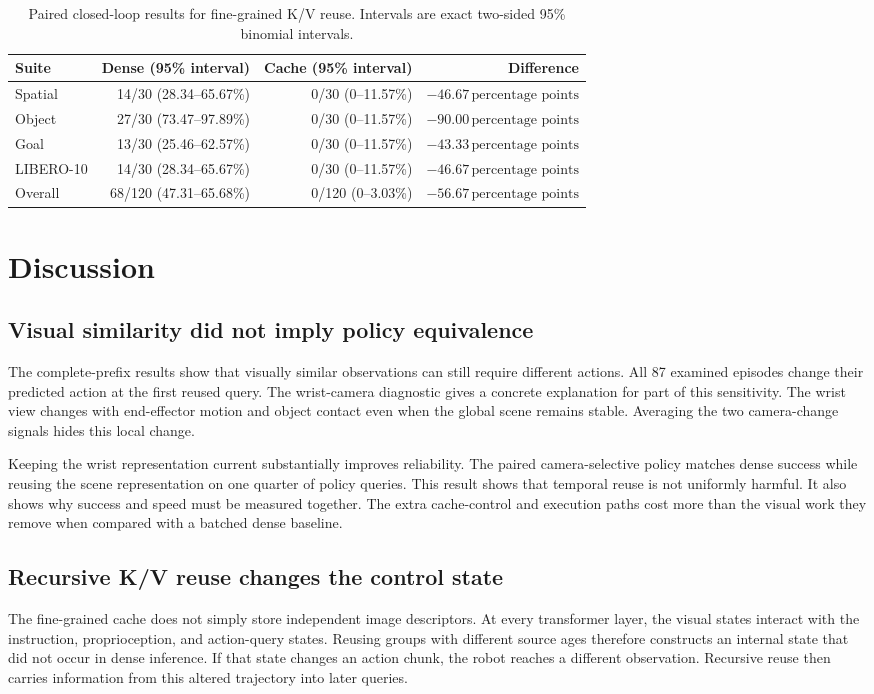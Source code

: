 \documentclass[journal]{IEEEtran}
\newcommand{\pp}{\,\text{percentage points}}
\begin{document}
\begin{table}[t]
\caption{Paired closed-loop results for fine-grained K/V reuse. Intervals are exact two-sided 95\% binomial intervals.}
\label{tab:kv}
\centering
\scriptsize
\begin{tabular}{@{}lrrr@{}}
\toprule
Suite & Dense (95\% interval) & Cache (95\% interval) & Difference \\
\midrule
Spatial & 14/30 (28.34--65.67\%) & 0/30 (0--11.57\%) & $-46.67\pp$ \\
Object & 27/30 (73.47--97.89\%) & 0/30 (0--11.57\%) & $-90.00\pp$ \\
Goal & 13/30 (25.46--62.57\%) & 0/30 (0--11.57\%) & $-43.33\pp$ \\
LIBERO-10 & 14/30 (28.34--65.67\%) & 0/30 (0--11.57\%) & $-46.67\pp$ \\
Overall & 68/120 (47.31--65.68\%) & 0/120 (0--3.03\%) & $-56.67\pp$ \\
\bottomrule
\end{tabular}
\end{table}

\section{Discussion}
\subsection{Visual similarity did not imply policy equivalence}
The complete-prefix results show that visually similar observations can still require different actions. All 87 examined episodes change their predicted action at the first reused query. The wrist-camera diagnostic gives a concrete explanation for part of this sensitivity. The wrist view changes with end-effector motion and object contact even when the global scene remains stable. Averaging the two camera-change signals hides this local change.

Keeping the wrist representation current substantially improves reliability. The paired camera-selective policy matches dense success while reusing the scene representation on one quarter of policy queries. This result shows that temporal reuse is not uniformly harmful. It also shows why success and speed must be measured together. The extra cache-control and execution paths cost more than the visual work they remove when compared with a batched dense baseline.

\subsection{Recursive K/V reuse changes the control state}
The fine-grained cache does not simply store independent image descriptors. At every transformer layer, the visual states interact with the instruction, proprioception, and action-query states. Reusing groups with different source ages therefore constructs an internal state that did not occur in dense inference. If that state changes an action chunk, the robot reaches a different observation. Recursive reuse then carries information from this altered trajectory into later queries.
\end{document}
